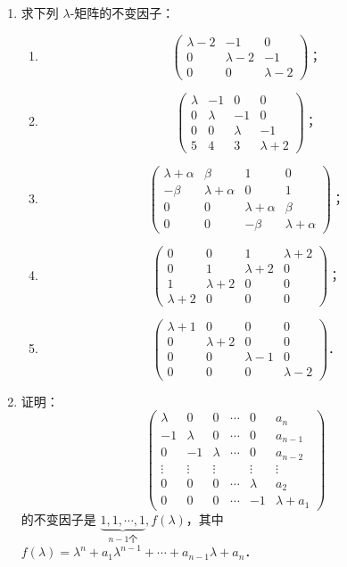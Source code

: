 \begin{enumerate}
  \item 求下列 $\lambda$-矩阵的不变因子：
  \begin{enumerate}
    \item \[
    \begin{pmatrix}
      \lambda-2 & -1 & 0 \\
      0 & \lambda-2 & -1 \\
      0 & 0 & \lambda-2
    \end{pmatrix}\text{；}
    \]
  \anssub
    \item \[
    \begin{pmatrix}
      \lambda & -1 & 0 & 0 \\
      0 & \lambda & -1 & 0 \\
      0 & 0 & \lambda & -1 \\
      5 & 4 & 3 & \lambda+2
    \end{pmatrix}\text{；}
    \]
  \anssub
    \item \[
    \begin{pmatrix}
      \lambda+\alpha & \beta & 1 & 0 \\
      -\beta & \lambda+\alpha & 0 & 1 \\
      0 & 0 & \lambda+\alpha & \beta \\
      0 & 0 & -\beta & \lambda+\alpha
    \end{pmatrix}\text{；}
    \]
  \anssub
    \item \[
    \begin{pmatrix}
      0 & 0 & 1 & \lambda+2 \\
      0 & 1 & \lambda+2 & 0 \\
      1 & \lambda+2 & 0 & 0 \\
      \lambda+2 & 0 & 0 & 0
    \end{pmatrix}\text{；}
    \]
  \anssub
    \item \[
    \begin{pmatrix}
      \lambda+1 & 0 & 0 & 0 \\
      0 & \lambda+2 & 0 & 0 \\
      0 & 0 & \lambda-1 & 0 \\
      0 & 0 & 0 & \lambda-2
    \end{pmatrix}\text{．}
    \]
  \anssub
  \end{enumerate}

  \item 证明：
  \[
  \begin{pmatrix}
    \lambda & 0 & 0 & \cdots & 0 & a_n \\
    -1 & \lambda & 0 & \cdots & 0 & a_{n-1} \\
    0 & -1 & \lambda & \cdots & 0 & a_{n-2} \\
    \vdots & \vdots & \vdots & & \vdots & \vdots \\
    0 & 0 & 0 & \cdots & \lambda & a_2 \\
    0 & 0 & 0 & \cdots & -1 & \lambda+a_1
  \end{pmatrix}
  \]
  的不变因子是 $\underbrace{1,1,\cdots,1}_{n-1\text{个}},f(\lambda)$，其中 $f(\lambda)=\lambda^n+a_1\lambda^{n-1}+\cdots+a_{n-1}\lambda+a_n$．


\end{enumerate}
